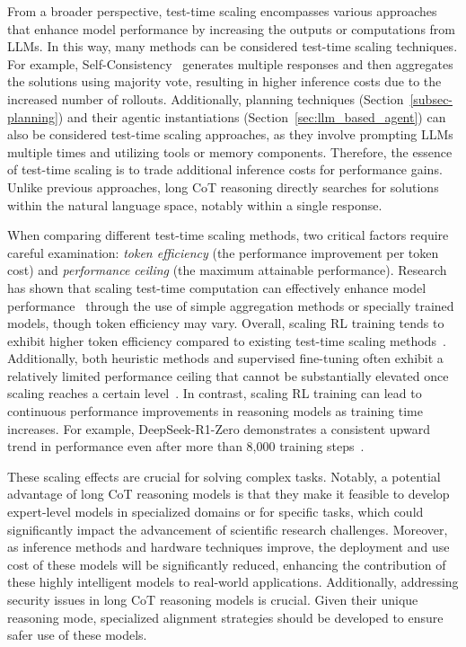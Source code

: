 From a broader perspective, test-time scaling encompasses various approaches that enhance model performance by increasing the outputs or computations from LLMs. In this way, many methods can be considered test-time scaling techniques. For example, Self-Consistency~\cite{Wang-arxiv-2022-Self-Consistency} generates multiple responses and then aggregates the solutions using majority vote, resulting in higher inference costs due to the increased number of rollouts. Additionally, planning techniques (Section~\ref{subsec-planning}) and their agentic instantiations (Section~\ref{sec:llm_based_agent}) can also be considered test-time scaling approaches, as they involve prompting LLMs multiple times and utilizing tools or memory components. Therefore, the essence of test-time scaling is to trade additional inference costs for performance gains. Unlike previous approaches, long CoT reasoning directly searches for solutions within the natural language space, notably within a single response.

When comparing different test-time scaling methods, two critical factors require careful examination: \emph{token efficiency} (the performance improvement per token cost) and \emph{performance ceiling} (the maximum attainable performance). Research has shown that scaling test-time computation can effectively enhance model performance~\cite{Charlie-arxiv-2024-Scaling,Deepseek-arxiv-2025-DeepSeek} through the use of simple aggregation methods or specially trained models, though token efficiency may vary. Overall, scaling RL training tends to exhibit higher token efficiency compared to existing test-time scaling methods~\cite{Deepseek-arxiv-2025-DeepSeek}. Additionally, both heuristic methods and supervised fine-tuning often exhibit a relatively limited performance ceiling that cannot be substantially elevated once scaling reaches a certain level~\cite{Min-arxiv-2024-Imitate,Charlie-arxiv-2024-Scaling}. In contrast, scaling RL training can lead to continuous performance improvements in reasoning models as training time increases. For example, DeepSeek-R1-Zero demonstrates a consistent upward trend in performance even after more than 8,000 training steps~\cite{Deepseek-arxiv-2025-DeepSeek}. 

These scaling effects are crucial for solving complex tasks. Notably, a potential advantage of long CoT reasoning models is that they make it feasible to develop expert-level models in specialized domains or for specific tasks, which could significantly impact the advancement of scientific research challenges. Moreover, as inference methods and hardware techniques improve, the deployment and use cost of these models will be significantly reduced, enhancing the contribution of these highly intelligent models to real-world applications. Additionally, addressing security issues in long CoT reasoning models is crucial. Given their unique reasoning mode, specialized alignment strategies should be developed to ensure safer use of these models.

